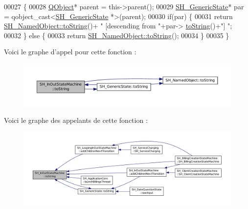 \begin{DoxyCode}
00027 \{
00028     \hyperlink{classQObject}{QObject}* parent = this->parent();
00029     \hyperlink{classSH__GenericState}{SH\_GenericState}* par = qobject\_cast<\hyperlink{classSH__GenericState}{SH\_GenericState} *>(parent);
00030     \textcolor{keywordflow}{if}(par) \{
00031         \textcolor{keywordflow}{return} \hyperlink{classSH__NamedObject_af73e97f6476ca1ef3a22b159d179f5e7}{SH\_NamedObject::toString}()+ \textcolor{stringliteral}{" [descending from "}+par->
      \hyperlink{classSH__GenericState_a5480c5ee725fd801d8f6292cd4c803b8}{toString}()+\textcolor{stringliteral}{"] "};
00032     \} \textcolor{keywordflow}{else} \{
00033         \textcolor{keywordflow}{return} \hyperlink{classSH__NamedObject_af73e97f6476ca1ef3a22b159d179f5e7}{SH\_NamedObject::toString}();
00034     \}
00035 \}
\end{DoxyCode}


Voici le graphe d'appel pour cette fonction \-:
\nopagebreak
\begin{figure}[H]
\begin{center}
\leavevmode
\includegraphics[width=350pt]{classSH__InOutStateMachine_a60ecd7de03d948e2d1e9cbedb5c3e5fa_cgraph}
\end{center}
\end{figure}




Voici le graphe des appelants de cette fonction \-:
\nopagebreak
\begin{figure}[H]
\begin{center}
\leavevmode
\includegraphics[width=350pt]{classSH__InOutStateMachine_a60ecd7de03d948e2d1e9cbedb5c3e5fa_icgraph}
\end{center}
\end{figure}


